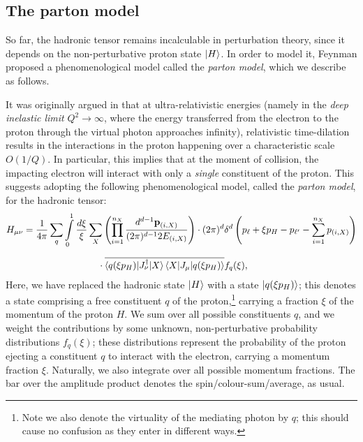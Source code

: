 \documentclass[withindex,glossary]{cam-thesis}
\renewcommand{\vec}[1]{\textbf{#1}} %
\begin{document}
\subsection{The parton model}
So far, the hadronic tensor remains incalculable in perturbation theory, since it depends on the non-perturbative proton state $\ket{H}$. In order to model it, Feynman proposed a phenomenological model called the \textit{parton model}, which we describe as follows. 

It was originally argued in \cite{Feynman:1969wa} that at ultra-relativistic energies (namely in the \textit{deep inelastic limit} $Q^2 \rightarrow \infty$, where the energy transferred from the electron to the proton through the virtual photon approaches infinity), relativistic time-dilation results in the interactions in the proton happening over a characteristic scale $O(1/Q)$. In particular, this implies that at the moment of collision, the impacting electron will interact with only a \textit{single} constituent of the proton. This suggests adopting the following phenomenological model, called the \textit{parton model}, for the hadronic tensor:
\begin{align}
\label{eq:parton_model_hadronic_tensor}
H_{\mu\nu} &= \frac{1}{4\pi} \sum_{q} \int\limits_{0}^{1} \frac{d\xi}{\xi} \sum_{X} \left(\prod_{i=1}^{n_X} \frac{d^{d-1} \vec{p}_{(i,X)}}{(2\pi)^{d-1} 2E_{(i,X)}}\right) \cdot (2\pi)^d \delta^d\left(p_\ell + \xi p_H - p_{\ell'} - \sum_{i=1}^{n_X} p_{(i,X)}\right)\notag \\[1.5ex]
&\qquad\qquad\qquad\qquad \cdot \overline{\braket{q(\xi p_H) | J_{\nu}^{\dagger} | X}\braket{X | J_{\mu} | q(\xi p_H) }} f_q(\xi),
\end{align}
Here, we have replaced the hadronic state $\ket{H}$ with a state $\ket{q(\xi p_H)}$; this denotes a state comprising a free constituent $q$ of the proton,\footnote{Note we also denote the virtuality of the mediating photon by $q$; this should cause no confusion as they enter in different ways.} carrying a fraction $\xi$ of the momentum of the proton $H$. We sum over all possible constituents $q$, and we weight the contributions by some unknown, non-perturbative probability distributions $f_q(\xi)$; these distributions represent the probability of the proton ejecting a constituent $q$ to interact with the electron, carrying a momentum fraction $\xi$. Naturally, we also integrate over all possible momentum fractions. The bar over the amplitude product denotes the spin/colour-sum/average, as usual.
\end{document}
